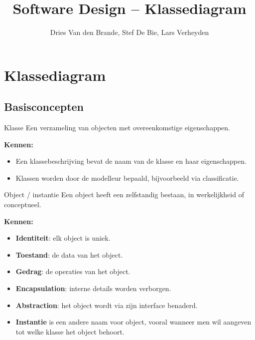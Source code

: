 \documentclass[11pt,a4paper]{article}
\title{Software Design -- Klassediagram}
\author{Dries Van den Brande, Stef De Bie, Lars Verheyden}
\date{}
\begin{document}
\maketitle

\section{Klassediagram}

\subsection{Basisconcepten}

\begin{definition}{Klasse}
Een verzameling van objecten met overeenkomstige eigenschappen.

\textbf{Kennen:}
\begin{itemize}
    \item Een klassebeschrijving bevat de naam van de klasse en haar eigenschappen.
    \item Klassen worden door de modelleur bepaald, bijvoorbeeld via classificatie.
\end{itemize}
\end{definition}

\begin{definition}{Object / instantie}
Een object heeft een zelfstandig bestaan, in werkelijkheid of conceptueel.

\textbf{Kennen:}
\begin{itemize}
    \item \textbf{Identiteit}: elk object is uniek.
    \item \textbf{Toestand}: de data van het object.
    \item \textbf{Gedrag}: de operaties van het object.
    \item \textbf{Encapsulation}: interne details worden verborgen.
    \item \textbf{Abstraction}: het object wordt via zijn interface benaderd.
    \item \textbf{Instantie} is een andere naam voor object, vooral wanneer men wil aangeven tot welke klasse het object behoort.
\end{itemize}
\end{definition}
\end{document}
